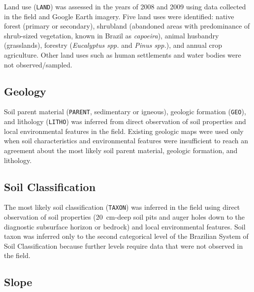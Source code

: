 Land use (\texttt{LAND}) was assessed in the years of \num{2008} and \num{2009} using data collected in the 
field and Google Earth imagery. Five land uses were identified: native forest (primary or secondary), 
shrubland 
(abandoned areas with predominance of shrub-sized vegetation, known in Brazil as \emph{capoeira}), animal 
husbandry (grasslands), forestry (\textit{Eucalyptus spp.} and \textit{Pinus spp.}), and annual crop 
agriculture. Other 
land uses such as human settlements and water bodies were not observed/sampled.

\subsection{Geology}

Soil parent material (\texttt{PARENT}, sedimentary or igneous), geologic formation (\texttt{GEO}), and 
lithology (\texttt{LITHO}) was inferred from direct observation of soil properties and local environmental 
features in the field. Existing geologic maps were used only when soil characteristics and environmental 
features were insufficient to reach an agreement about the most likely soil parent material, geologic 
formation, and lithology.

\subsection{Soil Classification}

The most likely soil classification (\texttt{TAXON}) was inferred in the field using direct observation of 
soil 
properties (\SI{20}{\centi\metre}-deep soil pits and auger holes down to the diagnostic subsurface horizon or 
bedrock) and local environmental features. Soil taxon was inferred only to the second categorical level of 
the Brazilian System of Soil Classification \cite{SantosEtAl2013a} because further levels require data that 
were not observed in the field.


\subsection{Slope}

